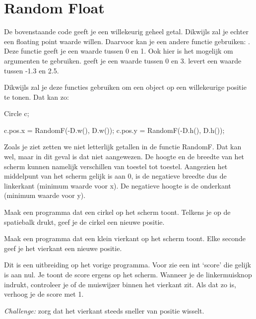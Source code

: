 \section{Random Float}
De bovenstaande code geeft je een willekeurig geheel getal. Dikwijls zal je echter een floating point waarde willen. Daarvoor kan je een andere functie gebruiken: . Deze functie geeft je een waarde tussen 0 en 1. Ook hier is het mogelijk om argumenten te gebruiken.  geeft je een waarde tussen 0 en 3.  levert een waarde tussen -1.3 en 2.5.

Dikwijls zal je deze functies gebruiken om een object op een willekeurige positie te tonen. Dat kan zo:

\begin{code}
Circle c;

c.pos.x = RandomF(-D.w(), D.w());
c.pos.y = RandomF(-D.h(), D.h());
\end{code}

Zoals je ziet zetten we niet letterlijk getallen in de functie RandomF. Dat kan wel, maar in dit geval is dat niet aangewezen. De hoogte en de breedte van het scherm kunnen namelijk verschillen van toestel tot toestel. Aangezien het middelpunt van het scherm gelijk is aan 0, is de negatieve breedte dus de linkerkant (minimum waarde voor x). De negatieve hoogte is de onderkant (minimum waarde voor y).

\begin{exercise}
Maak een programma dat een cirkel op het scherm toont. Telkens je op de spatiebalk drukt, geef je de cirkel een nieuwe positie.
\end{exercise}
\begin{exercise}
Maak een programma dat een klein vierkant op het scherm toont. Elke seconde geef je het vierkant een nieuwe positie.
\end{exercise}
\begin{exercise}
Dit is een uitbreiding op het vorige programma. Voor zie een int `score' die gelijk is aan nul. Je toont de score ergens op het scherm. Wanneer je de linkermuisknop indrukt, controleer je of de muiswijzer binnen het vierkant zit. Als dat zo is, verhoog je de score met 1.
\end{exercise}
\begin{exercise}
\textit{Challenge:} zorg dat het vierkant steeds sneller van positie wisselt.  
\end{exercise}



